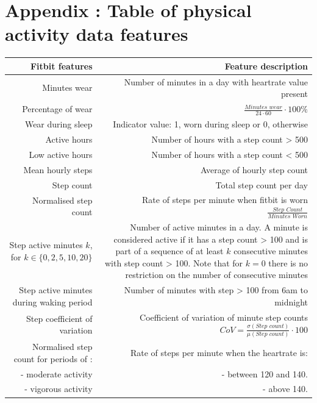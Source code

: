 \documentclass{article}
\begin{document}



\appendix

\section{Appendix : Table of physical activity data features}


\begin{longtable}{  n | d }
\toprule
\cmidrule(r){1-2}
\textbf{Fitbit features} & \textbf{Feature description} \\
\midrule
\endfirsthead
Minutes wear & Number of minutes in a day with heartrate value present \\
\midrule
Percentage of wear & $\frac{\textit{Minutes wear}}{24\cdot60}\cdot100\%$\\
\midrule
Wear during sleep & Indicator value: 1,  worn during sleep or 0, otherwise \\
\midrule
Active hours & Number of hours with a step count > 500  \\
\midrule
Low active hours & Number of hours with a step count < 500  \\
\midrule
Mean hourly steps & Average of hourly step count \\
\midrule
Step count & Total step count per day \\
\midrule
Normalised step count & Rate of steps per minute when fitbit is worn $\frac{\textit{Step Count}}{\textit{Minutes Worn}}$ \\
\midrule
 Step active minutes $k$, for $k\in \{0,2,5,10,20\}$ & Number of active minutes in a day. A minute is considered active if it has a step count > 100 and is part of a sequence of at least $k$ consecutive minutes with step count > 100. Note that for $k=0$ there is no restriction on the number of consecutive minutes\\
\midrule
Step active minutes during waking period & Number of minutes with step > 100 from 6am to midnight \\
\midrule
Step coefficient of variation & Coefficient of variation of minute step counts $CoV = \frac{\sigma (\textit{Step count})}{\mu (\textit{Step count})} \cdot 100$ \\
 \midrule
 Normalised step count for periods of : &  Rate of steps per minute when the heartrate is: \\
 - moderate activity & - between 120 and 140. \\ 
 - vigorous activity & - above 140. \\

\end{longtable}
\end{document}
